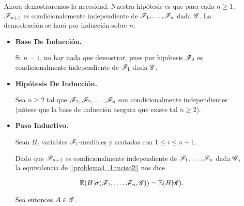 Ahora demostraremos la necesidad. Nuestra hipótesis es que para cada $n \geq 1$, $\mathscr{F}_{n+1}$ 
es condicionalemente independiente de $\mathscr{F}_1, \dots, \mathscr{F}_n$ dada $\mathscr{G}$. La demostración se hará por 
inducción sobre $n$.\par\null

\begin{itemize}
	\item 
        \textbf{Base De Inducción.}
        
        Si $n = 1$, no hay nada que demostrar, pues por hipótesis $\mathscr{F}_2$ es condicionalmente independiente de $\mathscr{F}_1$ dada $\mathscr{G}$.\par\null
        
    \item
        \textbf{Hipótesis De Inducción.}
        
        Sea $n \geq 2$ tal que $\mathscr{F}_1, \mathscr{F}_2, \dots, \mathscr{F}_n$ son condicionalmente independientes (nótese que la base de inducción 
        asegura que existe tal $n \geq 2$).\par\null
        
    \item
        \textbf{Paso Inductivo.}
        
        Sean $H_i$ variables $\mathscr{F}_{i}$-medibles y acotadas con $1 \leq i \leq n+1$.\par\null 
        
        Dado que $\mathscr{F}_{n + 1}$ es condicionalmente independiente de $\mathscr{F}_1, \dots, \mathscr{F}_n$ dada $\mathscr{G}$, la 
        equivalencia de [\ref{problema4_1:inciso2}] nos dice
        
        \begin{align}
            \mathbb{E}(H | \sigma(\mathscr{F}_1, \dots, \mathscr{F}_n, \mathscr{G})) = \mathbb{E}(H | \mathscr{G}). \label{problema4_1:equivalencia_necesidad_4_1_3}
        \end{align}\par\null

        Sea entonces $A \in \mathscr{G}$.
        

\end{itemize}
